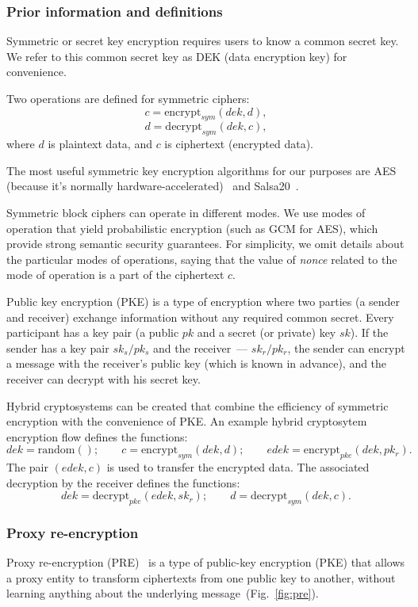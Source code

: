 \documentclass[notitlepage,longbibliography]{revtex4-1}
\begin{document}
\subsubsection{Prior information and definitions}

Symmetric or secret key encryption requires users to know a common secret key.
We refer to this common secret key as DEK (data encryption key) for convenience.

Two operations are defined for symmetric ciphers:
$$c = \text{encrypt}_{sym}(dek, d),$$
$$d = \text{decrypt}_{sym}(dek, c),$$
where $d$ is plaintext data, and $c$ is ciphertext (encrypted data).

The most useful symmetric key encryption algorithms for our purposes are AES (because it's normally hardware-accelerated)~\cite{wiki:aes}
and Salsa20~\cite{wiki:salsa20}.

Symmetric block ciphers can operate in different modes.
We use modes of operation that yield probabilistic encryption (such as GCM for AES), which provide strong semantic security guarantees.
For simplicity, we omit details about the particular modes of operations, saying that the value of \emph{nonce} related to the mode of operation is a part of the
ciphertext $c$.

Public key encryption (PKE) is a type of encryption where two parties (a sender and receiver) exchange information without any required common secret.
Every participant has a key pair (a public $pk$ and a secret (or private) key $sk$).
If the sender has a key pair $sk_s/pk_s$ and the receiver~--- $sk_r/pk_r$, the sender can encrypt a message with the receiver's public key (which is known in advance),
and the receiver can decrypt with his secret key.

Hybrid cryptosystems can be created that combine the efficiency of symmetric encryption with the convenience of PKE.
An example hybrid cryptosytem encryption flow defines the functions:
$$dek = \text{random}();\qquad c = \text{encrypt}_{sym}(dek, d);\qquad edek=\text{encrypt}_{pke}(dek, pk_r).$$
The pair $(edek, c)$ is used to transfer the encrypted data.
The associated decryption by the receiver defines the functions:
$$dek=\text{decrypt}_{pke}(edek, sk_r);\qquad d = \text{decrypt}_{sym}(dek, c).$$

\subsubsection{Proxy re-encryption}
Proxy re-encryption (PRE)~\cite{wiki:pre,phd:nunez} is a type of public-key encryption (PKE) that allows a proxy entity to transform ciphertexts
from one public key to another, without learning anything about the underlying message~(Fig.~\ref{fig:pre}).
\end{document}
